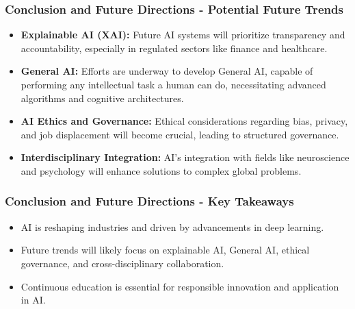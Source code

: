 \documentclass[aspectratio=169]{beamer}
\begin{document}
\begin{frame}[fragile]
    \frametitle{Conclusion and Future Directions - Potential Future Trends}
    \begin{itemize}
        \item \textbf{Explainable AI (XAI):} Future AI systems will prioritize transparency and accountability, especially in regulated sectors like finance and healthcare.
        \item \textbf{General AI:} Efforts are underway to develop General AI, capable of performing any intellectual task a human can do, necessitating advanced algorithms and cognitive architectures.
        \item \textbf{AI Ethics and Governance:} Ethical considerations regarding bias, privacy, and job displacement will become crucial, leading to structured governance.
        \item \textbf{Interdisciplinary Integration:} AI's integration with fields like neuroscience and psychology will enhance solutions to complex global problems.
    \end{itemize}
\end{frame}

\begin{frame}[fragile]
    \frametitle{Conclusion and Future Directions - Key Takeaways}
    \begin{itemize}
        \item AI is reshaping industries and driven by advancements in deep learning.
        \item Future trends will likely focus on explainable AI, General AI, ethical governance, and cross-disciplinary collaboration.
        \item Continuous education is essential for responsible innovation and application in AI.
    \end{itemize}
\end{frame}
\end{document}
